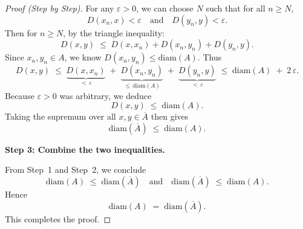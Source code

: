 \documentclass[12pt]{article}
\theoremstyle{definition} %
\theoremstyle{plain} %
\begin{document}
\begin{proof}[Proof (Step by Step)]
                            For any $\varepsilon > 0$, we can choose $N$ such that for all $n \ge N$,
                            \[
                            D(x_n,x) < \varepsilon
                            \quad\text{and}\quad
                            D(y_n,y) < \varepsilon.
                            \]
                            Then for $n \ge N$, by the triangle inequality:
                            \[
                            D(x,y)
                            \;\le\; 
                            D(x,x_n) + D(x_n,y_n) + D(y_n,y).
                            \]
                            Since $x_n, y_n \in A$, we know $D(x_n,y_n) \le \mathrm{diam}(A)$.  
                            Thus
                            \[
                            D(x,y)
                            \;\le\;
                            \underbrace{D(x,x_n)}_{<\,\varepsilon}
                            \;+\;
                            \underbrace{D(x_n,y_n)}_{\le\,\mathrm{diam}(A)}
                            \;+\;
                            \underbrace{D(y_n,y)}_{<\,\varepsilon}
                            \;\le\;
                            \mathrm{diam}(A) \;+\; 2\,\varepsilon.
                            \]
                            Because $\varepsilon>0$ was arbitrary, we deduce
                            \[
                            D(x,y) \;\le\; \mathrm{diam}(A).
                            \]
                            Taking the supremum over all $x,y\in \overline{A}$ then gives
                            \[
                            \mathrm{diam}(\overline{A})
                            \;\le\;
                            \mathrm{diam}(A).
                            \]
                            
                            \medskip
                            
                            \textbf{Step 3: Combine the two inequalities.}
                            
                            From Step~1 and Step~2, we conclude
                            \[
                            \mathrm{diam}(A) 
                            \;\le\; 
                            \mathrm{diam}(\overline{A})
                            \quad\text{and}\quad
                            \mathrm{diam}(\overline{A})
                            \;\le\;
                            \mathrm{diam}(A).
                            \]
                            Hence 
                            \[
                            \mathrm{diam}(A) \;=\; \mathrm{diam}(\overline{A}).
                            \]
                            This completes the proof.
                            \end{proof}
\end{document}
